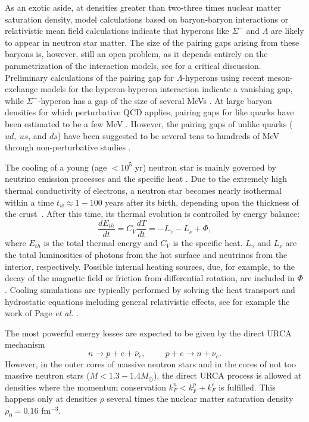 \documentclass[rmp,preprint,aps,floatfix]{revtex4}
\begin{document}
As an exotic aside, at densities greater than two-three times nuclear
matter saturation density, model calculations based on baryon-baryon
interactions \cite{stoks99,stoks2000,isaac2000,schulze1998,schulze2000b} or relativistic mean field calculations \cite{glendenning2000} indicate that hyperons like $\Sigma^-$ 
and $\Lambda$ are likely to appear in neutron star matter.
The size of the pairing gaps arising from these baryons is, however,
still an open problem, as it  depends entirely on the parametrization 
of the interaction models, see \cite{barnea1996,balberg1999,taka2002} 
for a critical 
discussion. 
Preliminary calculations of the pairing gap for $\Lambda$-hyperons
using recent  meson-exchange models for the hyperon-hyperon interaction  
\cite{stoks99} indicate a vanishing gap, while $\Sigma^-$-hyperon
has a gap of the size of several MeVs \cite{shulzeelgaroy_priv}.
 At large baryon densities for which perturbative QCD
applies, pairing gaps for like quarks have been estimated to be a few
MeV \cite{bailin84}.  However, the pairing gaps of unlike quarks ($ud,~
us$, and $ds$) have been suggested to be several tens to
hundreds of MeV through non-perturbative studies \cite{qsf0}.

The cooling of a young (age $<10^5$ yr) neutron star is mainly
governed by neutrino emission processes and the specific heat
\cite{page2000,schaab1996a,schaab1996b}.  
Due to the extremely high thermal conductivity of
electrons, a neutron star becomes nearly isothermal within a time
$t_w\approx1-100$ years after its birth, depending upon the thickness
of the crust~\cite{pr95}.  After this time, its thermal evolution is
controlled by energy balance: 
\begin{equation}
 \frac{dE_{th}}{dt} = C_V \frac{dT}{dt} = -L_{\gamma} -L_{\nu} + \Phi,
\label{equ:balance}
\end{equation} 
where $E_{th}$ is the total thermal energy and $C_V$ is the
specific heat.  $L_{\gamma}$ and $L_{\nu}$ are the total luminosities
of photons from the hot surface and neutrinos from the interior,
respectively.  Possible internal heating sources, due, for example, to
the decay of the magnetic field or friction from differential
rotation, are included in $\Phi$.  
Cooling simulations are typically performed
by solving the heat transport and hydrostatic equations including
general relativistic effects, see for example the work of Page 
{\em et al.} \cite{page2000}.  

The most powerful energy losses are expected to be given by the 
direct URCA mechanism
\begin{equation}
    n\rightarrow p +e +\overline{\nu}_e, \hspace{1cm} p+e \rightarrow
    n+\nu_e .
    \label{eq:directU}
\end{equation}
However, in the outer cores of massive neutron stars and in the
cores of not too massive neutron stars ($M < 1.3-1.4 M_{\odot}$), the direct
URCA process is allowed at densities
where the momentum conservation $k_F^n < k_F^p + k_F^e$ is
fulfilled. This happens
only at densities $\rho$ several times
the nuclear matter saturation density $\rho_0 =0.16$ fm$^{-3}$.
\end{document}
